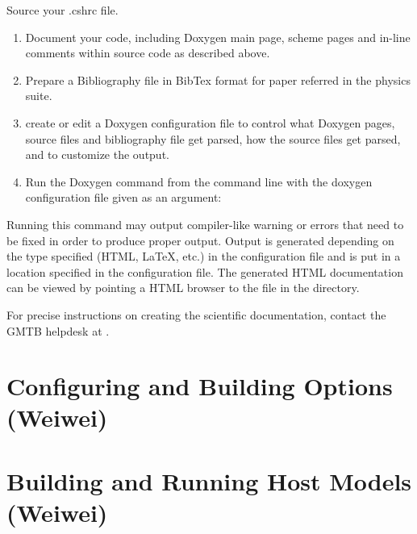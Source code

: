 \documentclass[letterpaper,10pt,english]{sphinxmanual}
\begin{document}
Source your .cshrc file.
\begin{enumerate}
\def\theenumi{\arabic{enumi}}
\def\labelenumi{\theenumi .}
\makeatletter\def\p@enumii{\p@enumi \theenumi .}\makeatother
\setcounter{enumi}{1}
\item {} 
Document your code, including Doxygen main page, scheme pages and in-line
comments within source code as described above.

\item {} 
Prepare a Bibliography file in BibTex format for paper referred in the physics suite.

\item {} 
create or edit a Doxygen configuration file to control what Doxygen pages, source
files and bibliography file get parsed, how the source files get parsed, and to
customize the output.

\item {} 
Run the Doxygen command from the command line with the doxygen configuration file
given as an argument:

\end{enumerate}
\begin{quote}

\end{quote}

Running this command may output compiler-like warning or errors that need to be fixed
in order to produce proper output. Output is generated depending on the type specified
(HTML, LaTeX, etc.) in the configuration file and is put in a location specified in the
configuration file. The generated HTML documentation can be viewed by pointing a HTML
browser to the  file in the  directory.

For precise instructions on creating the scientific documentation, contact the GMTB
helpdesk at .


\chapter{Configuring and Building Options (Weiwei)}
\label{\detokenize{ConfigBuildOptions:configuring-and-building-options-weiwei}}\label{\detokenize{ConfigBuildOptions:configbuildoptions}}\label{\detokenize{ConfigBuildOptions::doc}}

\chapter{Building and Running Host Models (Weiwei)}
\label{\detokenize{BuildingRunningHostModels:building-and-running-host-models-weiwei}}\label{\detokenize{BuildingRunningHostModels:buildingrunninghostmodels}}\label{\detokenize{BuildingRunningHostModels::doc}}
\end{document}
